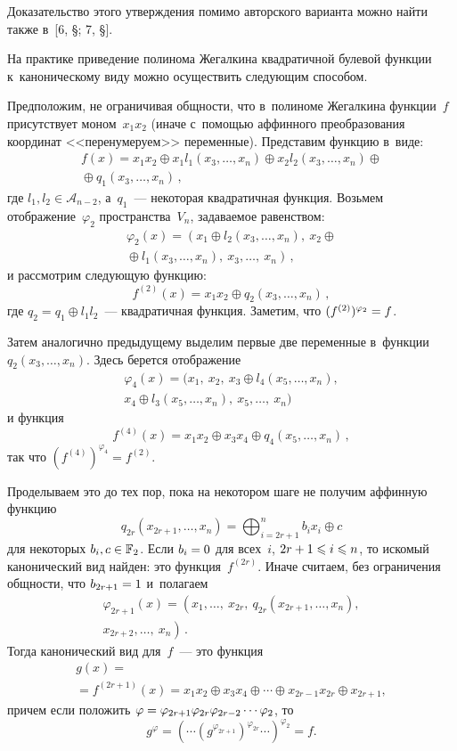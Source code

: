 \begin{multicols}{2}
\smallskip

Доказательство этого утверждения помимо авторского варианта можно найти также 
в~[6, \S{}; 7, \S{}].

На практике приведение полинома Жегалкина квадратичной булевой функции 
к~каноническому виду можно осуществить следующим способом.

Предположим, не ограничивая общности, что в~полиноме Жегалкина функции~$f$ 
присутствует моном~$x_1x_2$ (иначе с~помощью аффинного преобразования координат 
<<перенумеруем>> переменные).
Представим функцию в~виде:
\begin{multline*}
f(x)=x_1x_2\oplus x_1l_1(x_3,\ldots,x_n) \oplus x_2l_2(x_3,\ldots,x_n) \oplus{}\\
{}\oplus 
q_1(x_3,\ldots,x_n)\,,
\end{multline*}
где $l_1,l_2\in\mathcal{A}_{n-2}$, а~$q_1$~--- некоторая квадратичная функция.
Возьмем отображение~$\varphi_2$ пространства~$V_n$, задаваемое равенством:
\begin{multline*}
\varphi_2(x)=\left(x_1\oplus l_2(x_3,\ldots,x_n),\ x_2\oplus {}\right.\\
\left.{}\oplus
l_1(x_3,\ldots,x_n),\ x_3,\ldots,\ x_n\right)\,,
\end{multline*}
и рассмотрим следующую функцию:
$$
f^{(2)}(x)=x_1x_2\oplus q_2(x_3,\ldots,x_n)\,,
$$
где $q_2=q_1\oplus l_1l_2$~--- квадратичная функция.
Заметим, что $(f^{(2)})^{\varphi_2}\hm=f$.

Затем аналогично предыдущему выделим первые две переменные в~функции 
$q_2(x_3,\ldots,x_n)$.
Здесь берется отображение
\begin{multline*}
\varphi_4(x)=\bigl(x_1,\ x_2,\  x_3\oplus l_4(x_5,\ldots,x_n),\\
x_4\oplus 
l_3(x_5,\ldots,x_n),\ x_5,\ldots,\ x_n\bigr)
\end{multline*}
и функция
$$
f^{(4)}(x)=x_1x_2\oplus  x_3x_4\oplus q_4(x_5,\ldots,x_n)\,,
$$
так что $(f^{(4)})^{\varphi_4}=f^{(2)}$.

Проделываем это до тех пор, пока на некотором шаге не получим аффинную функцию
$$
q_{2r}(x_{2r+1},\ldots,x_n)=\bigoplus_{i=2r+1}^{n}b_ix_i\oplus c
$$
для некоторых $b_i,c\hm\in\mathbb{F}_2$.
Если $b_i\hm=0$ для всех~$i$, $2r\hm+1\hm\leqslant i\hm\leqslant n$, 
то искомый канонический вид 
найден: это функция~$f^{(2r)}$.
Иначе считаем, без ограничения общности, что $b_{2r+1}\hm=1$ и~полагаем
\begin{multline*}
\varphi_{2r+1}(x)=\left(x_1,\ldots,\ x_{2r},\ 
q_{2r}\left(x_{2r+1},\ldots,x_n\right),\right.\\ 
\left.x_{2r+2},\ldots,\ x_n\right)\,.
\end{multline*}
Тогда канонический вид для~$f$~--- это функция
\begin{multline*}
g(x)={}\\
{}=f^{(2r+1)}(x)=x_1x_2\oplus  x_3x_4\oplus \cdots \oplus x_{2r-1}x_{2r} 
\oplus x_{2r+1},
\end{multline*}
причем если положить $\varphi\hm=\varphi_{2r+1}\varphi_{2r}
\varphi_{2r-2}\cdots\varphi_2$, то
$$
g^{\varphi}=\left(\cdots(g^{\varphi_{2r+1}})^{\varphi_{2r}}\cdots\right)^{\varphi_2}=f.$$


\end{multicols}
